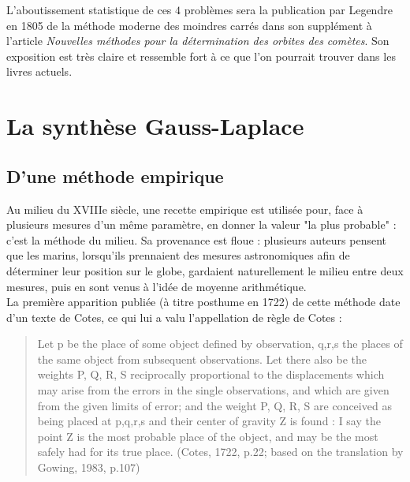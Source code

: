 \documentclass{article}
\begin{document}
L'aboutissement statistique de ces $4$ problèmes sera la publication par Legendre en 1805 de la méthode moderne des moindres carrés dans son supplément à l'article \textit{Nouvelles méthodes pour la détermination des orbites des comètes}. Son exposition est très claire et ressemble fort à ce que l'on pourrait trouver dans les livres actuels.\\

\section{La synthèse Gauss-Laplace}

\subsection{D'une méthode empirique}

Au milieu du XVIIIe siècle, une recette empirique est utilisée pour, face à plusieurs mesures d'un même paramètre, en donner la valeur "la plus probable" : c'est la méthode du milieu. Sa provenance est floue : plusieurs auteurs pensent que les marins, lorsqu'ils prennaient des mesures astronomiques afin de déterminer leur position sur le globe, gardaient naturellement le milieu entre deux mesures, puis en sont venus à l'idée de moyenne arithmétique.\\

La première apparition publiée (à titre posthume en 1722) de cette méthode date d'un texte de Cotes, ce qui lui a valu l'appellation de règle de Cotes :\\

\begin{quotation}Let p be the place of some object defined by observation, q,r,s the places of the same object from subsequent observations. Let there also be the weights P, Q, R, S reciprocally proportional to the displacements which may arise from the errors in the single observations, and which are given from the given limits of error; and the weight P, Q, R, S are conceived as being placed at p,q,r,s and their center of gravity Z is found : I say the point Z is the most probable place of the object, and may be the most safely had for its true place. (Cotes, 1722, p.22; based on the translation by Gowing, 1983, p.107)\end{quotation}
\end{document}
